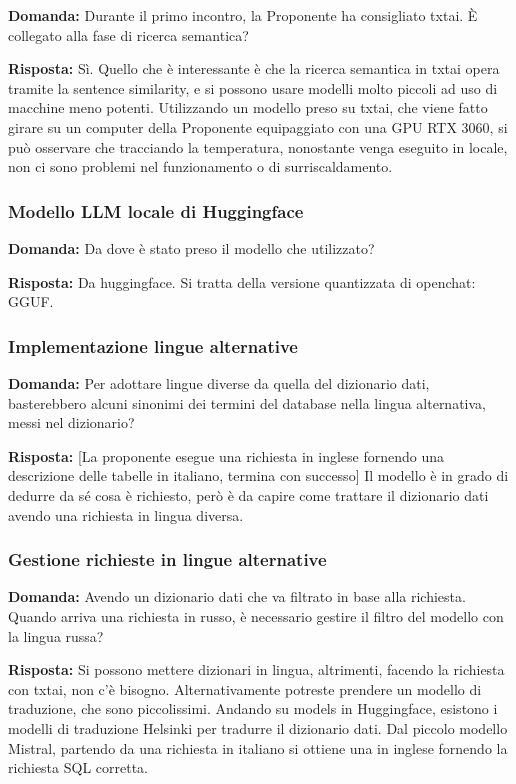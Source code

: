 \textbf{Domanda:} Durante il primo incontro, la Proponente ha consigliato txtai. È collegato alla fase di ricerca semantica?

\textbf{Risposta:} Sì. Quello che è interessante è che la ricerca semantica in txtai opera tramite la sentence similarity, e si possono usare modelli molto piccoli ad uso di macchine meno potenti.
Utilizzando un modello preso su txtai, che viene fatto girare su un computer della Proponente equipaggiato con una GPU RTX 3060, si può osservare che tracciando la temperatura, nonostante venga eseguito in locale, non ci sono problemi nel funzionamento o di surriscaldamento.


\subsubsection{Modello LLM locale di Huggingface}

\textbf{Domanda:} Da dove è stato preso il modello che utilizzato?

\textbf{Risposta:} Da huggingface. Si tratta della versione quantizzata di openchat: GGUF.

\subsubsection{Implementazione lingue alternative}

\textbf{Domanda:} Per adottare lingue diverse da quella del dizionario dati, basterebbero alcuni sinonimi dei termini del database nella lingua alternativa, messi nel dizionario?

\textbf{Risposta:} [La proponente esegue una richiesta in inglese fornendo una descrizione delle tabelle in italiano, termina con successo]
Il modello è in grado di dedurre da sé cosa è richiesto, però è da capire come trattare il dizionario dati avendo una richiesta in lingua diversa.

\subsubsection{Gestione richieste in lingue alternative}

\textbf{Domanda:} Avendo un dizionario dati che va filtrato in base alla richiesta. Quando arriva una richiesta in russo, è necessario gestire il filtro del modello con la lingua russa?

\textbf{Risposta:} Si possono mettere dizionari in lingua, altrimenti, facendo la richiesta con txtai, non c'è bisogno. Alternativamente potreste prendere un modello di traduzione, che sono piccolissimi. Andando su models in Huggingface, esistono i modelli di traduzione Helsinki per tradurre il dizionario dati.
Dal piccolo modello Mistral, partendo da una richiesta in italiano si ottiene una in inglese fornendo la richiesta SQL corretta.

